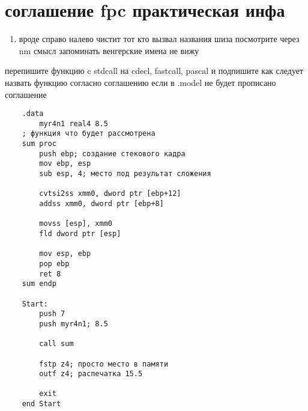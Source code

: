 \documentclass[a4paper,10pt]{article}
\begin{document}
\section*{соглашение fpc практическая инфа}
\begin{enumerate}
    \item вроде справо налево чистит тот кто вызвал названия шиза посмотрите через nm смысл запоминать венгерские имена не вижу
\end{enumerate}
перепишите функцию c stdcall на cdecl, fastcall, pascal и подпишите как следует назвать функцию согласно соглашению если в .model не будет прописано соглашение
\begin{verbatim}
    .data 
        myr4n1 real4 8.5
    ; функция что будет рассмотрена
    sum proc
        push ebp; создание стекового кадра
        mov ebp, esp
        sub esp, 4; место под результат сложения
    
        cvtsi2ss xmm0, dword ptr [ebp+12]
        addss xmm0, dword ptr [ebp+8]
    
        movss [esp], xmm0
        fld dword ptr [esp]
    
        mov esp, ebp
        pop ebp
        ret 8
    sum endp
    
    Start:
        push 7
        push myr4n1; 8.5
    
        call sum
    
        fstp z4; просто место в памяти
        outf z4; распечатка 15.5
    
        exit
    end Start
\end{verbatim}
\end{document}

